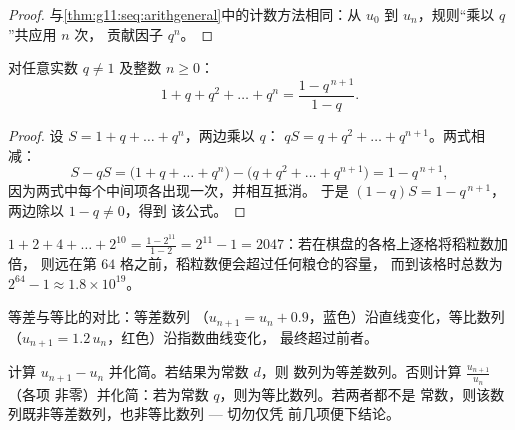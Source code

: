 \begin{proof}
与\cref{thm:g11:seq:arithgeneral}中的计数方法相同：从 $u_0$ 到
$u_n$，规则“乘以 $q$”共应用 $n$ 次，
贡献因子 $q^n$。
\end{proof}

\begin{theorem}[等比数列求和]\label{thm:g11:seq:geomsum}
对任意实数 $q \neq 1$ 及整数 $n \geq 0$：
\[
1 + q + q^2 + \dots + q^n = \frac{1 - q^{\,n+1}}{1 - q}.
\]
\end{theorem}

\begin{proof}
设 $S = 1 + q + \dots + q^n$，两边乘以 $q$：
$qS = q + q^2 + \dots + q^{n+1}$。两式相减：
\[
S - qS = \bigl(1 + q + \dots + q^n\bigr)
- \bigl(q + q^2 + \dots + q^{n+1}\bigr) = 1 - q^{\,n+1},
\]
因为两式中每个中间项各出现一次，并相互抵消。
于是 $(1 - q)S = 1 - q^{\,n+1}$，两边除以 $1 - q \neq 0$，得到
该公式。
\end{proof}

\begin{example}\label{ex:g11:seq:chessboard}
$1 + 2 + 4 + \dots + 2^{10} = \frac{1 - 2^{11}}{1 - 2} = 2^{11} - 1 =
2047$：若在棋盘的各格上逐格将稻粒数加倍，
则远在第 $64$ 格之前，稻粒数便会超过任何粮仓的容量，
而到该格时总数为 $2^{64} - 1 \approx 1.8 \times 10^{19}$。
\end{example}

\begin{omfigure}

{\small 等差与等比的对比：等差数列
（$u_{n+1} = u_n + 0.9$，蓝色）沿直线变化，等比数列
（$u_{n+1} = 1.2\,u_n$，红色）沿指数曲线变化，
最终超过前者。}
\end{omfigure}

\begin{method}[判断数列的类型]\label{met:g11:seq:recognize}
计算 $u_{n+1} - u_n$ 并化简。若结果为常数 $d$，则
数列为等差数列。否则计算 $\frac{u_{n+1}}{u_n}$（各项
非零）并化简：若为常数 $q$，则为等比数列。若两者都不是
常数，则该数列既非等差数列，也非等比数列 --- 切勿仅凭
前几项便下结论。
\end{method}

